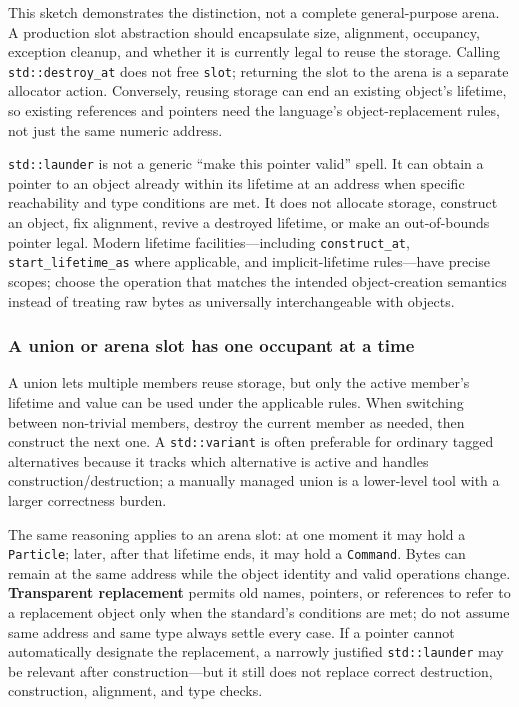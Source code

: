 This sketch demonstrates the distinction, not a complete general-purpose arena. A production slot abstraction should encapsulate size, alignment, occupancy, exception cleanup, and whether it is currently legal to reuse the storage. Calling \texttt{std::destroy\_at} does not free \texttt{slot}; returning the slot to the arena is a separate allocator action. Conversely, reusing storage can end an existing object's lifetime, so existing references and pointers need the language's object-replacement rules, not just the same numeric address.

\texttt{std::launder} is not a generic ``make this pointer valid'' spell. It can obtain a pointer to an object already within its lifetime at an address when specific reachability and type conditions are met. It does not allocate storage, construct an object, fix alignment, revive a destroyed lifetime, or make an out-of-bounds pointer legal. Modern lifetime facilities---including \texttt{construct\_at}, \texttt{start\_lifetime\_as} where applicable, and implicit-lifetime rules---have precise scopes; choose the operation that matches the intended object-creation semantics instead of treating raw bytes as universally interchangeable with objects.

\subsubsection{A union or arena slot has one occupant at a time}\label{a-union-or-arena-slot-has-one-occupant-at-a-time}

A union lets multiple members reuse storage, but only the active member's lifetime and value can be used under the applicable rules. When switching between non-trivial members, destroy the current member as needed, then construct the next one. A \texttt{std::variant} is often preferable for ordinary tagged alternatives because it tracks which alternative is active and handles construction/destruction; a manually managed union is a lower-level tool with a larger correctness burden.

The same reasoning applies to an arena slot: at one moment it may hold a \texttt{Particle}; later, after that lifetime ends, it may hold a \texttt{Command}. Bytes can remain at the same address while the object identity and valid operations change. \textbf{Transparent replacement} permits old names, pointers, or references to refer to a replacement object only when the standard's conditions are met; do not assume same address and same type always settle every case. If a pointer cannot automatically designate the replacement, a narrowly justified \texttt{std::launder} may be relevant after construction---but it still does not replace correct destruction, construction, alignment, and type checks.

